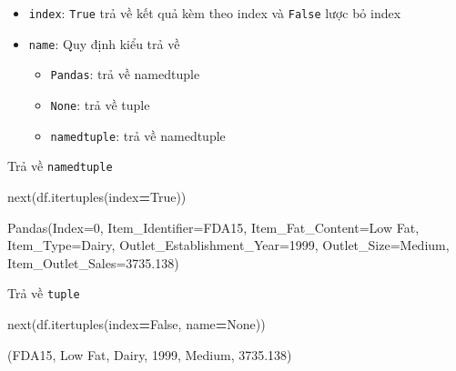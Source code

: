 \documentclass[
]{book}
\newenvironment{Shaded}{\begin{snugshade}}{\end{snugshade}}
\newcommand{\BuiltInTok}[1]{#1}
\newcommand{\NormalTok}[1]{#1}
\newcommand{\OperatorTok}[1]{\textcolor[rgb]{0.81,0.36,0.00}{\textbf{#1}}}
\newcommand{\VariableTok}[1]{\textcolor[rgb]{0.00,0.00,0.00}{#1}}
\providecommand{\tightlist}{%
  \setlength{\itemsep}{0pt}\setlength{\parskip}{0pt}}
\begin{document}
\begin{itemize}
\item
  \texttt{index}: \texttt{True} trả về kết quả kèm theo index và \texttt{False} lược bỏ index
\item
  \texttt{name}: Quy định kiểu trả về

  \begin{itemize}
  \tightlist
  \item
    \texttt{Pandas}: trả về namedtuple
  \item
    \texttt{None}: trả về tuple
  \item
    \texttt{namedtuple}: trả về namedtuple
  \end{itemize}
\end{itemize}

Trả về \texttt{namedtuple}

\begin{Shaded}
\begin{Highlighting}[]
\BuiltInTok{next}\NormalTok{(df.itertuples(index}\OperatorTok{=}\VariableTok{True}\NormalTok{))}
\end{Highlighting}
\end{Shaded}

\begin{Shaded}
\begin{Highlighting}[]
\NormalTok{Pandas(Index=0, Item\_Identifier=\textquotesingle{}FDA15\textquotesingle{}, Item\_Fat\_Content=\textquotesingle{}Low Fat\textquotesingle{}, Item\_Type=\textquotesingle{}Dairy\textquotesingle{}, Outlet\_Establishment\_Year=1999, Outlet\_Size=\textquotesingle{}Medium\textquotesingle{}, Item\_Outlet\_Sales=3735.138)}
\end{Highlighting}
\end{Shaded}

Trả về \texttt{tuple}

\begin{Shaded}
\begin{Highlighting}[]
\BuiltInTok{next}\NormalTok{(df.itertuples(index}\OperatorTok{=}\VariableTok{False}\NormalTok{, name}\OperatorTok{=}\VariableTok{None}\NormalTok{))}
\end{Highlighting}
\end{Shaded}

\begin{Shaded}
\begin{Highlighting}[]
\NormalTok{(\textquotesingle{}FDA15\textquotesingle{}, \textquotesingle{}Low Fat\textquotesingle{}, \textquotesingle{}Dairy\textquotesingle{}, 1999, \textquotesingle{}Medium\textquotesingle{}, 3735.138)}
\end{Highlighting}
\end{Shaded}
\end{document}
